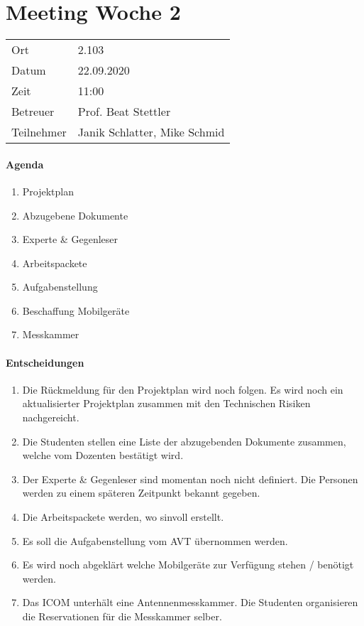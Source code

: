 
\section*{Meeting Woche 2}

\begin{table}[h!]
	\begin{tabularx}{\textwidth}{l X }
		Ort & 2.103 \\
		Datum & 22.09.2020 \\
		Zeit & 11:00 \\
		Betreuer & Prof. Beat Stettler\\
		Teilnehmer & Janik Schlatter, Mike Schmid \\
	\end{tabularx}
\end{table}

\paragraph{Agenda}
\begin{enumerate}
	\item Projektplan
	\item Abzugebene Dokumente
	\item Experte \& Gegenleser
	\item Arbeitspackete
	\item Aufgabenstellung
	\item Beschaffung Mobilgeräte
	\item Messkammer
\end{enumerate}

\paragraph{Entscheidungen}
\begin{enumerate}
	\item Die Rückmeldung für den Projektplan wird noch folgen. 
	Es wird noch ein aktualisierter Projektplan zusammen mit den Technischen 
	Risiken nachgereicht.
	\item Die Studenten stellen eine Liste der abzugebenden Dokumente zusammen, 
	welche vom Dozenten bestätigt wird.
	\item Der Experte \& Gegenleser sind momentan noch nicht definiert. 
	Die Personen werden zu einem späteren Zeitpunkt bekannt gegeben.
	\item Die Arbeitspackete werden, wo sinvoll erstellt.
	\item Es soll die Aufgabenstellung vom AVT übernommen werden.
	\item Es wird noch abgeklärt welche Mobilgeräte zur Verfügung stehen / 
	benötigt werden. 
	\item Das ICOM unterhält eine Antennenmesskammer. 
	Die Studenten organisieren die Reservationen für die Messkammer selber.
\end{enumerate}
\clearpage 

